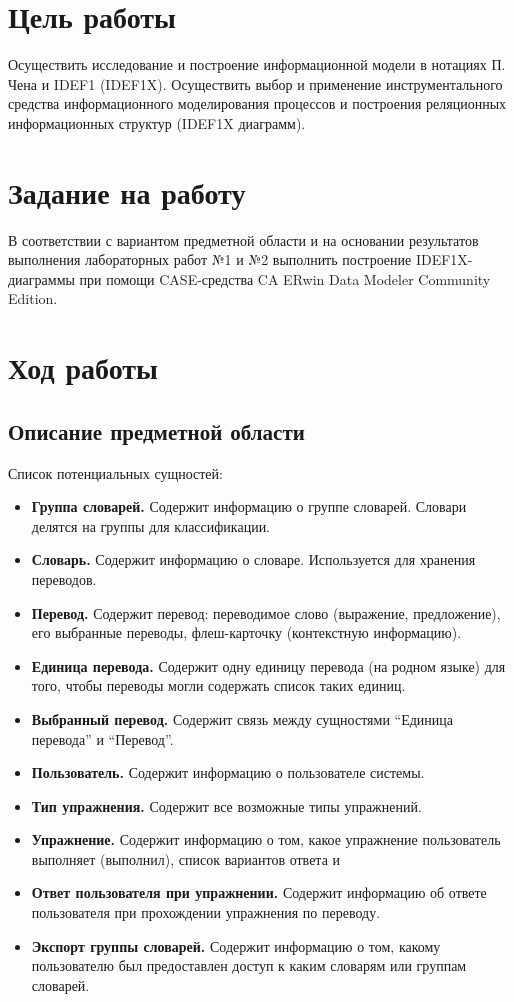 \documentclass[a4paper,14pt]{extarticle}
\begin{document}


\section{Цель работы}
Осуществить исследование и построение информационной модели в нотациях П. Чена и
IDEF1 (IDEF1X). Осуществить выбор и применение инструментального средства
информационного моделирования процессов и построения реляционных информационных
структур (IDEF1X диаграмм).

\section{Задание на работу}
В соответствии с вариантом предметной области и на основании результатов
выполнения лабораторных работ №1 и №2 выполнить построение IDEF1X-диаграммы при
помощи CASE-средства CA ERwin Data Modeler Community \\Edition.

\section{Ход работы}
\subsection{Описание предметной области}
Список потенциальных сущностей:

\begin{itemize}
    \item \textbf{Группа словарей.} Содержит информацию о группе словарей.
          Словари делятся на группы для классификации.
    \item \textbf{Словарь.} Содержит информацию о словаре. Используется для
          хранения переводов.
    \item \textbf{Перевод.} Содержит перевод: переводимое слово (выражение,
          предложение), его выбранные переводы, флеш-карточку (контекстную
          информацию).
    \item \textbf{Единица перевода.} Содержит одну единицу перевода (на родном
          языке) для того, чтобы переводы могли содержать список таких единиц.
    \item \textbf{Выбранный перевод.} Содержит связь между сущностями
          \enquote{Единица перевода} и \enquote{Перевод}.
    \item \textbf{Пользователь.} Содержит информацию о пользователе системы.
    \item \textbf{Тип упражнения.} Содержит все возможные типы упражнений.
    \item \textbf{Упражнение.} Содержит информацию о том, какое упражнение
          пользователь выполняет (выполнил), список вариантов ответа и 
    \item \textbf{Ответ пользователя при упражнении.} Содержит информацию об
          ответе пользователя при прохождении упражнения по переводу.
    \item \textbf{Экспорт группы словарей.} Содержит информацию о том, какому
          пользователю был предоставлен доступ к каким словарям или группам
          словарей.
\end{itemize}
\end{document}
